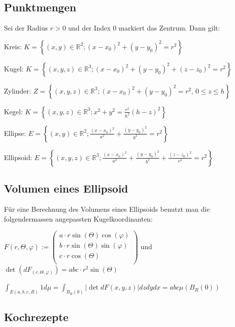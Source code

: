 \documentclass[a4paper, fontsize = 8pt, landscape]{scrartcl}
\begin{document}
\begin{multicols*}{3}
    \begin{small}
        \subsection{Punktmengen}

        Sei der Radius $r > 0$ und der Index 0 markiert das Zentrum. Dann gilt: \medskip

        Kreis: $K = \left\{(x, y)\in \mathbb{R}^2; (x-x_0)^2+(y-y_0)^2 = r^2 \right\}$ \medskip

        Kugel: $K = \left\{(x, y, z)\in \mathbb{R}^3; (x-x_0)^2+(y-y_0)^2+(z-z_0)^2 = r^2 \right\}$ \medskip

        Zylinder: $Z=\left\{(x, y, z)\in \mathbb{R}^3; (x-x_0)^2+(y-y_0)^2 =r^2, \, 0\le z \le h \right\}$ \medskip

        Kegel: $K=\left\{(x, y, z)\in \mathbb{R}^3; x^2+y^2 = \frac{r^2}{h^2}(h-z)^2 \right\}$ \medskip

        Ellipse: $E=\left\{(x, y)\in \mathbb{R}^2; \frac{(x-x_0)^2}{a^2}+\frac{(y-y_0)^2 }{b^2} = r^2 \right\}$ \medskip

        Ellipsoid: $E=\left\{(x, y, z)\in \mathbb{R}^3; \frac{(x-x_0)^2}{a^2}+\frac{(y-y_0)^2}{b^2} +\frac{(z-z_0)^2}{c^2} = r^2 \right\}$

        \subsection{Volumen eines Ellipsoid}

        Für eine Berechnung des Volumens eines Ellipsoids benutzt man die folgendermassen angepassten Kugelkoordinanten:

        \begin{center}
            $F(r, \Theta, \varphi) := \begin{pmatrix}
                    a \cdot r \sin(\Theta) \cos(\varphi) \\ b \cdot r \sin(\Theta) \sin(\varphi) \\ c \cdot r \cos(\Theta) \\
                \end{pmatrix}$ und $\det(dF_{(r, \Theta, \varphi)}) = abc \cdot r^2 \sin(\Theta)$
        \end{center}

        $\int_{E(a, b, c, R)} 1 d \mu=\int_{B_{R}(0)}|\det d F(x, y, z)| d z d y d x = abc \mu\left(B_{R}(0)\right)$

        \subsection{Kochrezepte}


\end{small}
\end{multicols*}
\end{document}
